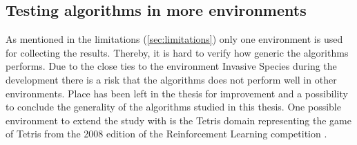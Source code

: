 \subsection{Testing algorithms in more environments }
As mentioned in the limitations (\ref{sec:limitations}) only one environment is used for collecting the results. Thereby, it is hard to verify how generic the algorithms performs. Due to the close ties to the environment Invasive Species during the development there is a risk that the algorithms does not perform well in other environments. Place has been left in the thesis for improvement and a possibility to conclude the generality of the algorithms studied in this thesis. One possible environment to extend the study with is the Tetris domain representing the game of Tetris from the 2008 edition of the Reinforcement Learning competition \parencite{whiteson2010reinforcement}.  
